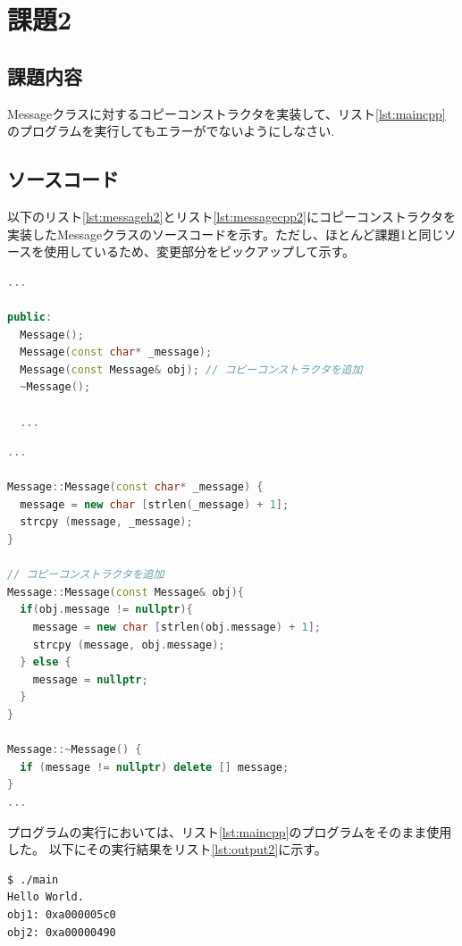 \documentclass[paper=a4,fontsize=11pt]{jlreq}
\begin{document}
\section{課題2}
\subsection{課題内容}
Messageクラスに対するコピーコンストラクタを実装して、リスト\ref{lst:maincpp}のプログラムを実行してもエラーがでないようにしなさい.

\subsection{ソースコード}

以下のリスト\ref{lst:messageh2}とリスト\ref{lst:messagecpp2}にコピーコンストラクタを実装したMessageクラスのソースコードを示す。ただし、ほとんど課題1と同じソースを使用しているため、変更部分をピックアップして示す。

\begin{lstlisting}[language=C++, caption=Message.h (課題2), label=lst:messageh2]
...

public:
  Message();
  Message(const char* _message);
  Message(const Message& obj); // コピーコンストラクタを追加
  ~Message();

  ...
\end{lstlisting}

\begin{lstlisting}[language=C++, caption=Message.cpp (課題2), label=lst:messagecpp2]
...

Message::Message(const char* _message) {
  message = new char [strlen(_message) + 1];
  strcpy (message, _message);
}

// コピーコンストラクタを追加
Message::Message(const Message& obj){
  if(obj.message != nullptr){
    message = new char [strlen(obj.message) + 1];
    strcpy (message, obj.message);
  } else {
    message = nullptr;
  }
}

Message::~Message() {
  if (message != nullptr) delete [] message;
}
...
\end{lstlisting}

プログラムの実行においては、リスト\ref{lst:maincpp}のプログラムをそのまま使用した。
以下にその実行結果をリスト\ref{lst:output2}に示す。

\begin{lstlisting}[language=bash, caption=実行結果 (課題2), label=lst:output2]
$ ./main
Hello World.
obj1: 0xa000005c0
obj2: 0xa00000490
\end{lstlisting}
\end{document}
